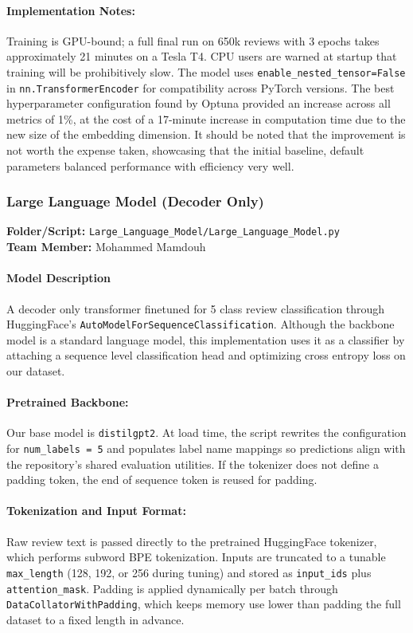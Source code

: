 \documentclass[12pt]{article}
\begin{document}
\paragraph{Implementation Notes:}
Training is GPU-bound; a full final run on 650k reviews with 3 epochs takes approximately 21 minutes on a Tesla T4. CPU users are warned at startup that training will be prohibitively slow. The model uses \texttt{enable\_nested\_tensor=False} in \texttt{nn.TransformerEncoder} for compatibility across PyTorch versions. The best hyperparameter configuration found by Optuna provided an increase across all metrics of 1\%, at the cost of a 17-minute increase in computation time due to the new size of the embedding dimension. It should be noted that the improvement is not worth the expense taken, showcasing that the initial baseline, default parameters balanced performance with efficiency very well.


\subsubsection{Large Language Model (Decoder Only)}
\textbf{Folder/Script:} \texttt{Large\_Language\_Model/Large\_Language\_Model.py}\\
\textbf{Team Member:} Mohammed Mamdouh

\paragraph{Model Description}
A decoder only transformer finetuned for 5 class review classification through HuggingFace's \texttt{AutoModelForSequenceClassification}. Although the backbone model is a standard language model, this implementation uses it as a classifier by attaching a sequence level classification head and optimizing cross entropy loss on our dataset.


\paragraph{Pretrained Backbone:}
Our base model is \texttt{distilgpt2}. At load time, the script rewrites the configuration for \texttt{num\_labels = 5} and populates label name mappings so predictions align with the repository's shared evaluation utilities. If the tokenizer does not define a padding token, the end of sequence token is reused for padding.


\paragraph{Tokenization and Input Format:}
Raw review text is passed directly to the pretrained HuggingFace tokenizer, which performs subword BPE tokenization. Inputs are truncated to a tunable \texttt{max\_length} (128, 192, or 256 during tuning) and stored as \texttt{input\_ids} plus \texttt{attention\_mask}. Padding is applied dynamically per batch through \texttt{DataCollatorWithPadding}, which keeps memory use lower than padding the full dataset to a fixed length in advance.
\end{document}
